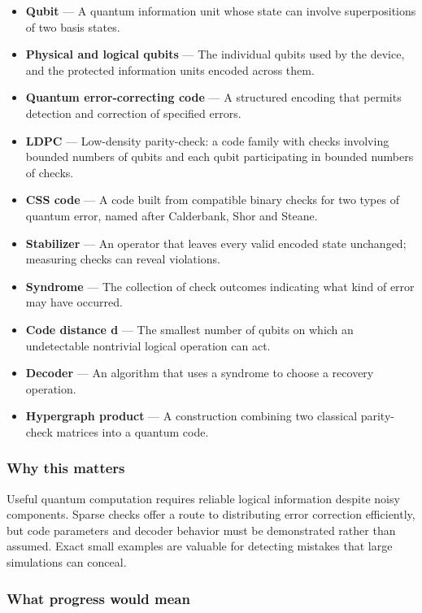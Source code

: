 \documentclass[
  11pt,
]{article}
\begin{document}
\begin{itemize}
\item
  \textbf{Qubit} --- A quantum information unit whose state can involve
  superpositions of two basis states.
\item
  \textbf{Physical and logical qubits} --- The individual qubits used by
  the device, and the protected information units encoded across them.
\item
  \textbf{Quantum error-correcting code} --- A structured encoding that
  permits detection and correction of specified errors.
\item
  \textbf{LDPC} --- Low-density parity-check: a code family with checks
  involving bounded numbers of qubits and each qubit participating in
  bounded numbers of checks.
\item
  \textbf{CSS code} --- A code built from compatible binary checks for
  two types of quantum error, named after Calderbank, Shor and Steane.
\item
  \textbf{Stabilizer} --- An operator that leaves every valid encoded
  state unchanged; measuring checks can reveal violations.
\item
  \textbf{Syndrome} --- The collection of check outcomes indicating what
  kind of error may have occurred.
\item
  \textbf{Code distance d} --- The smallest number of qubits on which an
  undetectable nontrivial logical operation can act.
\item
  \textbf{Decoder} --- An algorithm that uses a syndrome to choose a
  recovery operation.
\item
  \textbf{Hypergraph product} --- A construction combining two classical
  parity-check matrices into a quantum code.
\end{itemize}

\subsubsection{Why this matters}

Useful quantum computation requires reliable logical information despite
noisy components. Sparse checks offer a route to distributing error
correction efficiently, but code parameters and decoder behavior must be
demonstrated rather than assumed. Exact small examples are valuable for
detecting mistakes that large simulations can conceal.

\subsubsection{What progress would mean}
\end{document}

